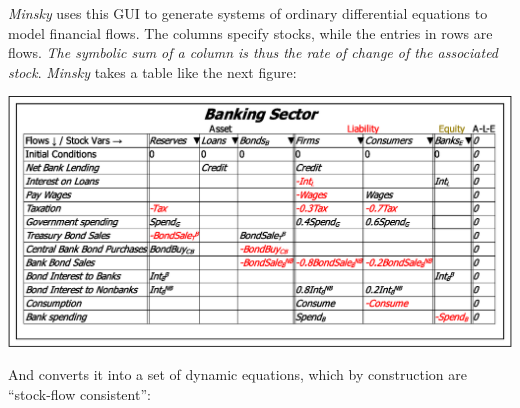 \emph{Minsky} uses this GUI to generate systems of ordinary differential
equations to model financial flows. The columns specify stocks, while
the entries in rows are flows. \emph{The symbolic sum of a column
is thus the rate of change of the associated stock}. \emph{Minsky}
takes a table like the next figure:

\noindent\includegraphics[width=\textwidth]{images/GodleyTableSingle}

And converts it into a set of dynamic equations, which by construction
are ``stock-flow consistent'':

